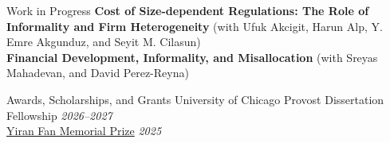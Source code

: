 \documentclass{resume} %
\begin{document}
		\begin{rSection}{Work in Progress}
			\textbf{Cost of Size-dependent Regulations: The Role of Informality and Firm Heterogeneity} (with Ufuk Akcigit, Harun Alp, Y. Emre Akgunduz, and Seyit M. Cilasun)\\

			\textbf{Financial Development, Informality, and Misallocation} (with Sreyas Mahadevan, and David Perez-Reyna)
		\end{rSection}

	\pagebreak
		\begin{rSection}{Awards, Scholarships, and Grants}
			University of Chicago Provost Dissertation Fellowship \hfill {\em 2026--2027}\\
			\href{https://www.chicagobooth.edu/phd/yiran-fan-memorial-conference}{Yiran Fan Memorial Prize} \hfill {\em 2025}
		\end{rSection}
\end{document}
